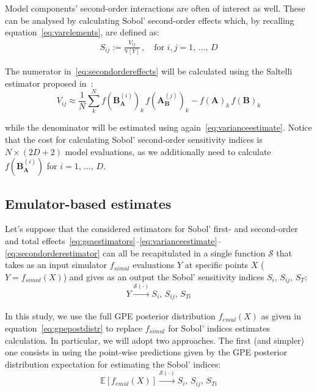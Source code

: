 \vspace{0.2cm}
Model components' second-order interactions are often of interest as well. These can be analysed by calculating Sobol' second-order effects which, by recalling equation~\eqref{eq:varelements}, are defined as:
%
\begin{align}\label{eq:secondordereffects}
    S_{ij} := \frac{V_{ij}}{\mathbb{V}[Y]}\,,\quad\text{for}\,\,i,j=1,\,\dots,\,D
\end{align}

\noindent
The numerator in~\eqref{eq:secondordereffects} will be calculated using the Saltelli estimator proposed in~\cite{Saltelli:2002}:
%
\begin{equation}\label{eq:secondorderestimator}
   V_{ij} \approx \frac{1}{N}\sum_{k}^{N}f(\mathbf{B}_{\mathbf{A}}^{(i)})_k\,f(\mathbf{A}_{\mathbf{B}}^{(j)})_k - f(\mathbf{A})_k\,f(\mathbf{B})_k
\end{equation}

\noindent
while the denominator will be estimated using again~\eqref{eq:varianceestimate}. Notice that the cost for calculating Sobol' second-order sensitivity indices is $N\times (2D + 2)$ model evaluations, as we additionally need to calculate $f(\mathbf{B}_{\mathbf{A}}^{(i)})$ for $i=1,\,\dots,\,D$.


%
%
%
\subsection{Emulator-based estimates}
Let's suppose that the considered estimators for Sobol' first- and second-order and total effects~\eqref{eq:gsaestimators}--\eqref{eq:varianceestimate}--\eqref{eq:secondorderestimator} can all be recapitulated in a single function $\mathcal{S}$ that takes as an input simulator $f_{simul}$ evaluations $Y$ at specific points $X$ ($Y=f_{simul}(X)$) and gives as an output the Sobol' sensitivity indices $S_i,\,S_{ij},\,S_{T}$:
%
\begin{equation}\label{eq:modelevalsgsa}
    Y\xrightarrow[]{\mathcal{S}(\cdot)} S_i,\,S_{ij},\,S_{Ti}
\end{equation}

\noindent
In this study, we use the full GPE posterior distribution $f_{emul}(X)$ as given in equation~\eqref{eq:gpepostdistr} to replace $f_{simul}$ for Sobol' indices estimates calculation. In particular, we will adopt two approaches. The first (and simpler) one consists in using the point-wise predictions given by the GPE posterior distribution expectation for estimating the Sobol' indices:
%
\begin{equation}\label{eq:emulmeangsa}
    \mathbb{E}[f_{emul}(X)]\xrightarrow[]{\mathcal{S}(\cdot)} S_i,\,S_{ij},\,S_{Ti}
\end{equation}

